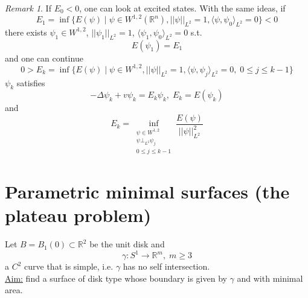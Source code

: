 \documentclass[a4paper, 12pt]{article}
\theoremstyle{plain}
\theoremstyle{definition}
\theoremstyle{lemma}
\theoremstyle{remark}
\newtheorem{remark}[theorem]{Remark}
\theoremstyle{corollary}
\theoremstyle{example}
\begin{document}
	\begin{remark}
		If $E_0 < 0$, one can look at excited states. With the same ideas, if \[E_1 = \inf\{E(\psi)\mid \psi \in W^{1,2}(\mathbb{R}^n), ||\psi||_{L^2} = 1, \langle\psi, \psi_0\rangle_{L^2} = 0\} <0\] there exists $\psi_1 \in W^{1,2}$, $||\psi_1||_{L^2} = 1$, $\langle\psi_1,\psi_0\rangle_{L^2} = 0$ s.t. \[E(\psi_1) = E_1\] and one can continue \[0 > E_k = \inf\{E(\psi) \mid \psi \in W^{1,2}, ||\psi||_{L^2}=1, \langle \psi, \psi_j \rangle_{L^2} = 0, \; 0 \leq j \leq k-1\}\]
		$\psi_k$ satisfies \[-\Delta \psi_k + v\psi_k = E_k\psi_k, \; E_k = E(\psi_k)\] and \[E_k = \inf_{\substack{\psi \in W^{1,2} \\ \psi \bot_{L^2} \psi_j \\ 0 \leq j \leq k-1}} \frac{E(\psi)}{||\psi||_{L^2}^2}\]
	\end{remark}
	\section{Parametric minimal surfaces (the plateau problem)}
	Let $B=B_1(0) \subset \mathbb{R}^2$ be the unit disk and \[\gamma: S^1 \to \mathbb{R}^m, \; m \geq 3\]
	a $C^2$ curve that is simple, i.e. $\gamma$ has no self intersection.\\
	\underline{Aim:} find a surface of disk type whose boundary is given by $\gamma$ and with minimal area.
\end{document}
